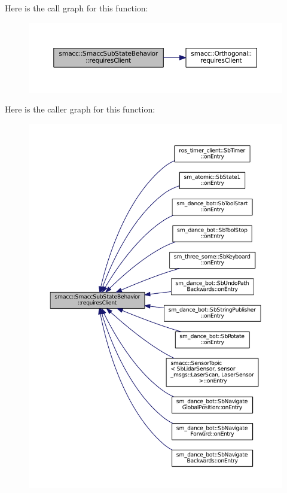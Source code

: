 Here is the call graph for this function\+:
\nopagebreak
\begin{figure}[H]
\begin{center}
\leavevmode
\includegraphics[width=350pt]{classsmacc_1_1SmaccSubStateBehavior_ae8361a9e794b02f9f3d962b881e4fd7d_cgraph}
\end{center}
\end{figure}




Here is the caller graph for this function\+:
\nopagebreak
\begin{figure}[H]
\begin{center}
\leavevmode
\includegraphics[width=350pt]{classsmacc_1_1SmaccSubStateBehavior_ae8361a9e794b02f9f3d962b881e4fd7d_icgraph}
\end{center}
\end{figure}


